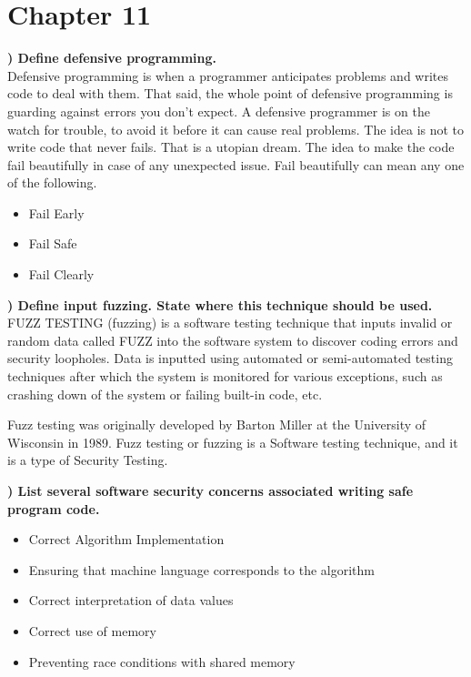 \documentclass{report}
\title{\classinfo}
\author{\semester}
\date{\today}
\newcommand{\mysection}[1]{\section*{#1}}
\newcommand{\mysubsection}[2]{\textbf{\romannumeral #1) #2}}
\begin{document}
\maketitle

\mysection{\textbf{Chapter 11}}

\mysubsection{1}{Define defensive programming.}
\\Defensive programming is when a programmer anticipates problems and writes code to deal with them.
That said, the whole point of defensive programming is guarding against errors you don’t expect. 
A defensive programmer is on the watch for trouble, to avoid it before it can cause real problems. 
The idea is not to write code that never fails. 
That is a utopian dream. The idea to make the code fail beautifully in case of any unexpected issue. 
Fail beautifully can mean any one of the following.
\begin{itemize}
  \item{Fail Early} 
  \item{Fail Safe} 
  \item{Fail Clearly} 
\end{itemize}

\noindent\mysubsection{2}{Define input fuzzing. State where this technique should be used.}
\\FUZZ TESTING (fuzzing) is a software testing technique that inputs invalid or 
random data called FUZZ into the software system to discover 
coding errors and security loopholes. Data is inputted using 
automated or semi-automated testing techniques after which the 
system is monitored for various exceptions, such as crashing down 
of the system or failing built-in code, etc.

Fuzz testing was originally developed by Barton Miller at the 
University of Wisconsin in 1989. Fuzz testing or fuzzing is a 
Software testing technique, and it is a type of Security Testing.

\noindent\mysubsection{3}{List several software security concerns associated writing safe program code.}
\begin{itemize}
  \item{Correct Algorithm Implementation} 
  \item{Ensuring that machine language corresponds to the algorithm} 
  \item{Correct interpretation of data values} 
  \item{Correct use of memory} 
  \item{Preventing race conditions with shared memory} 
\end{itemize}
\end{document}
